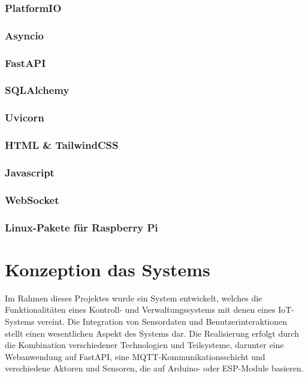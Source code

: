 \documentclass[12pt, letterpaper]{article}
\begin{document}
  \subsubsection{PlatformIO}
    \subsubsection{Asyncio}
    \subsubsection{FastAPI}
    \subsubsection{SQLAlchemy}
    \subsubsection{Uvicorn}
    \subsubsection{HTML \& TailwindCSS}
    \subsubsection{Javascript}
    \subsubsection{WebSocket}
    \subsubsection{Linux-Pakete für Raspberry Pi}

\newpage
\section{Konzeption das Systems}
\par Im Rahmen dieses Projektes wurde ein System entwickelt, welches die Funktionalitäten eines Kontroll- und Verwaltungssystems mit denen eines IoT-Systems vereint. Die Integration von Sensordaten und Benutzerinteraktionen stellt einen wesentlichen Aspekt des Systems dar. Die Realisierung erfolgt durch die Kombination verschiedener Technologien und Teilsysteme, darunter eine Webanwendung auf FastAPI, eine MQTT-Kommunikationsschicht und verschiedene Aktoren und Sensoren, die auf Arduino- oder ESP-Module basieren.
\end{document}
